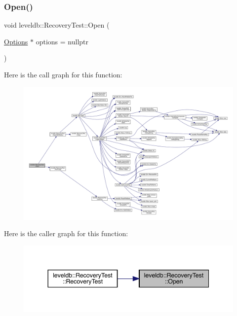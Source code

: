 \subsubsection{\texorpdfstring{Open()}{Open()}}
{\footnotesize\ttfamily void leveldb\+::\+Recovery\+Test\+::\+Open (\begin{DoxyParamCaption}\item[{\mbox{\hyperlink{structleveldb_1_1_options}{Options}} $\ast$}]{options = {\ttfamily nullptr} }\end{DoxyParamCaption})\hspace{0.3cm}{\ttfamily [inline]}}

Here is the call graph for this function\+:
\nopagebreak
\begin{figure}[H]
\begin{center}
\leavevmode
\includegraphics[width=350pt]{classleveldb_1_1_recovery_test_ada3cbb27c8b7dd9eb4e0be43a476bb2e_cgraph}
\end{center}
\end{figure}
Here is the caller graph for this function\+:
\nopagebreak
\begin{figure}[H]
\begin{center}
\leavevmode
\includegraphics[width=344pt]{classleveldb_1_1_recovery_test_ada3cbb27c8b7dd9eb4e0be43a476bb2e_icgraph}
\end{center}
\end{figure}
\mbox{\label{classleveldb_1_1_recovery_test_a24c107441e4cd205302496825eb6cef7}} 
